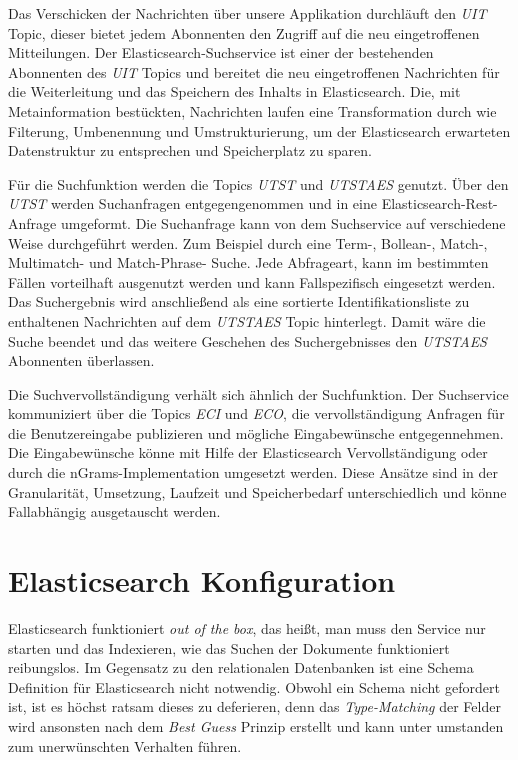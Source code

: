 Das Verschicken der Nachrichten über unsere Applikation durchläuft den \textit{UIT} Topic, dieser bietet jedem Abonnenten den Zugriff auf die neu eingetroffenen Mitteilungen. Der Elasticsearch-Suchservice ist einer der bestehenden Abonnenten des \textit{UIT} Topics und bereitet die neu eingetroffenen Nachrichten für die Weiterleitung und das Speichern des Inhalts in Elasticsearch. Die, mit Metainformation bestückten, Nachrichten laufen eine Transformation durch wie Filterung, Umbenennung und Umstrukturierung, um der Elasticsearch erwarteten Datenstruktur zu entsprechen und Speicherplatz zu sparen. 

Für die Suchfunktion werden die Topics \textit{UTST} und \textit{UTSTAES} genutzt. Über den \textit{UTST} werden Suchanfragen entgegengenommen und in eine Elasticsearch-Rest-Anfrage umgeformt. Die Suchanfrage kann von dem Suchservice auf verschiedene Weise durchgeführt werden. Zum Beispiel durch eine Term-, Bollean-, Match-, Multimatch- und Match-Phrase- Suche. Jede Abfrageart, kann im bestimmten Fällen vorteilhaft ausgenutzt werden und kann Fallspezifisch eingesetzt werden. 
Das Suchergebnis wird anschließend als eine sortierte Identifikationsliste zu enthaltenen Nachrichten auf dem \textit{UTSTAES} Topic hinterlegt. Damit wäre die Suche beendet und das weitere Geschehen des Suchergebnisses den \textit{UTSTAES} Abonnenten überlassen.

Die Suchvervollständigung verhält sich ähnlich der Suchfunktion. Der Suchservice kommuniziert über die Topics \textit{ECI} und \textit{ECO}, die vervollständigung Anfragen für die Benutzereingabe publizieren und mögliche Eingabewünsche entgegennehmen. Die Eingabewünsche könne mit Hilfe der Elasticsearch Vervollständigung oder durch die nGrams-Implementation umgesetzt werden. Diese Ansätze sind in der Granularität, Umsetzung, Laufzeit und Speicherbedarf unterschiedlich und könne Fallabhängig ausgetauscht werden. 


\section{Elasticsearch Konfiguration}
Elasticsearch funktioniert \textit{out of the box}, das heißt, man muss den Service nur starten und das Indexieren, wie das Suchen der Dokumente funktioniert reibungslos. Im Gegensatz zu den relationalen Datenbanken ist eine Schema Definition für Elasticsearch nicht notwendig. Obwohl ein Schema nicht gefordert ist, ist es höchst ratsam dieses zu deferieren, denn das \textit{Type-Matching} der Felder wird ansonsten nach dem \textit{Best Guess} Prinzip erstellt und kann unter umstanden zum unerwünschten Verhalten führen.

